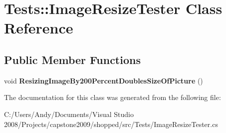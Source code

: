 \hypertarget{class_tests_1_1_image_resize_tester}{
\section{Tests::ImageResizeTester Class Reference}
\label{class_tests_1_1_image_resize_tester}
}
\subsection*{Public Member Functions}
\begin{DoxyCompactItemize}
\item 
\hypertarget{class_tests_1_1_image_resize_tester_a2ceceeb25362f1535aedc853a08be1d8}{
void {\bfseries ResizingImageBy200PercentDoublesSizeOfPicture} ()}
\label{class_tests_1_1_image_resize_tester_a2ceceeb25362f1535aedc853a08be1d8}

\end{DoxyCompactItemize}


The documentation for this class was generated from the following file:\begin{DoxyCompactItemize}
\item 
C:/Users/Andy/Documents/Visual Studio 2008/Projects/capstone2009/shopped/src/Tests/ImageResizeTester.cs\end{DoxyCompactItemize}
